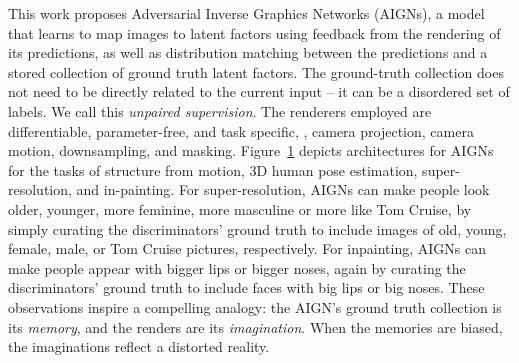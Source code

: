 \documentclass[10pt,twocolumn,letterpaper]{article}
\begin{document}
\begin{bibunit}[ieee]
\begin{figure}[t!]
\label{fig:framework}
\end{figure}This work proposes Adversarial Inverse Graphics Networks (AIGNs),  a model that learns to map images to latent factors using feedback from the rendering of its predictions, as well as distribution matching between the predictions and a stored collection of ground truth latent factors. 
The ground-truth collection does not need to be directly related to the current input -- it can be a disordered set of labels. We call this \textit{unpaired supervision}. The renderers employed are differentiable, parameter-free, and task specific, \eg, camera projection, camera motion, downsampling, and masking. 
Figure~\ref{fig:framework} depicts architectures for AIGNs for the tasks of structure from motion, 3D human pose estimation, super-resolution, and in-painting. 
For super-resolution, AIGNs can make people look older, younger, more feminine, more masculine or more like Tom Cruise, by simply curating the discriminators' ground truth to include images of old, young, female, male, or Tom Cruise pictures, respectively. 
For inpainting, AIGNs can make people appear with bigger lips or bigger noses, %
again by curating the discriminators' ground truth to include faces with big lips or big noses. These observations inspire a compelling analogy: the AIGN's ground truth collection is its \textit{memory}, and the renders are its \textit{imagination}. When the memories are biased, the imaginations reflect a distorted reality.

\end{bibunit}
\end{document}
